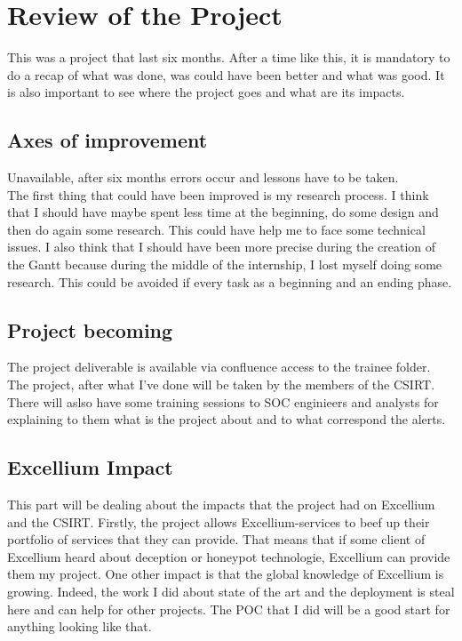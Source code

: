 \documentclass{tnreport}
\begin{document}
\cleardoublepage


\chapter{Review of the Project}
This was a project that last six months. After a time like this, it is mandatory to do a recap of what was done, was could have been better and what was good. It is also important to see where the project goes and what are its impacts.

\section{Axes of improvement}
Unavailable, after six months errors occur and lessons have to be taken. \\
The first thing that could have been improved is my research process. I think that I should have maybe spent less time at the beginning, do some design and then do again some research. This could have help me to face some technical issues. I also think that I should have been more precise during the creation of the Gantt because during the middle of the internship, I lost myself doing some research. This could be avoided if every task as a beginning and an ending phase. 

\section{Project becoming}
The project deliverable is available via confluence access to the trainee folder. The project, after what I've done will be taken by the members of the CSIRT. There will aslso have some training sessions to SOC enginieers and analysts for explaining to them what is the project about and to what correspond the alerts.


\section{\gls{Excellium} Impact}
This part will be dealing about the impacts that the project had on Excellium and the CSIRT.
Firstly, the project allows Excellium-services to beef up their portfolio of services that they can provide. That means that if some client of Excellium heard about deception or honeypot technologie, Excellium can provide them my project.
One other impact is that the global knowledge of Excellium is growing. Indeed, the work I did about state of the art and the deployment is steal here and can help for other projects. The POC that I did will be a good start for anything looking like that.
\end{document}
